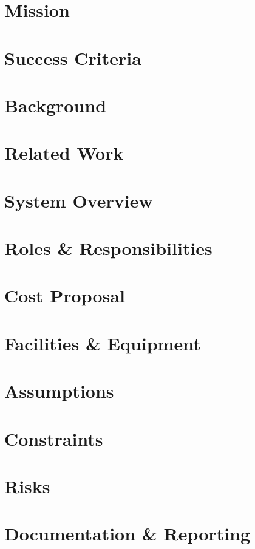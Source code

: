 \documentclass[11pt,letterpaper]{article}
\begin{document}
\section{Mission}

\section{Success Criteria}

\newpage

\section{Background}

\section{Related Work}

\section{System Overview}

\section{Roles \& Responsibilities}

\section{Cost Proposal}

\section{Facilities \& Equipment}

\section{Assumptions}

\section{Constraints}

\section{Risks}

\section{Documentation \& Reporting}

\newpage



{}
\end{document}
